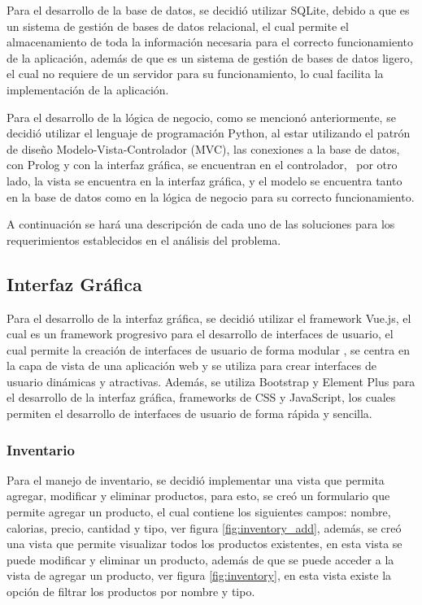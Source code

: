Para el desarrollo de la base de datos, se decidió utilizar SQLite, debido 
a que es un sistema de gestión de bases de datos relacional, el cual 
permite el almacenamiento de toda la información necesaria para el correcto 
funcionamiento de la aplicación, además de que es un sistema de gestión de 
bases de datos ligero, el cual no requiere de un servidor para su 
funcionamiento, lo cual facilita la implementación de la aplicación.

Para el desarrollo de la lógica de negocio, como se mencionó anteriormente, 
se decidió utilizar el lenguaje de programación Python, al estar utilizando 
el patrón de diseño Modelo-Vista-Controlador (MVC), las conexiones a la base de
datos, con Prolog y con la interfaz gráfica, se encuentran en el controlador, \
por otro lado, la vista se encuentra en la interfaz gráfica, y el modelo se
encuentra tanto en la base de datos como en la lógica de negocio para su
correcto funcionamiento.

A continuación se hará una descripción de cada uno de las soluciones 
para los requerimientos establecidos en el análisis del problema.

\subsection{Interfaz Gráfica}

Para el desarrollo de la interfaz gráfica, se decidió utilizar el framework 
Vue.js, el cual es un framework progresivo para el desarrollo de interfaces
de usuario, el cual permite la creación de interfaces de usuario de forma 
modular \cite{vuejs}, se centra en la capa de vista de una aplicación web y se
utiliza para crear interfaces de usuario dinámicas y atractivas. Además, 
se utiliza Bootstrap y Element Plus para el desarrollo de la interfaz gráfica, 
frameworks de CSS y JavaScript, los cuales permiten el desarrollo de interfaces
de usuario de forma rápida y sencilla.

\subsubsection{Inventario}

Para el manejo de inventario, se decidió implementar una vista que permita 
agregar, modificar y eliminar productos, para esto, se creó un formulario 
que permite agregar un producto, el cual contiene los siguientes campos: 
nombre, calorias, precio, cantidad y tipo, ver figura \ref{fig:inventory_add},
además, se creó una vista que permite visualizar todos los productos
existentes, en esta vista se puede modificar y eliminar un producto, además de
que se puede acceder a la vista de agregar un producto, ver figura
\ref{fig:inventory}, en esta vista existe la opción de filtrar los productos 
por nombre y tipo.

